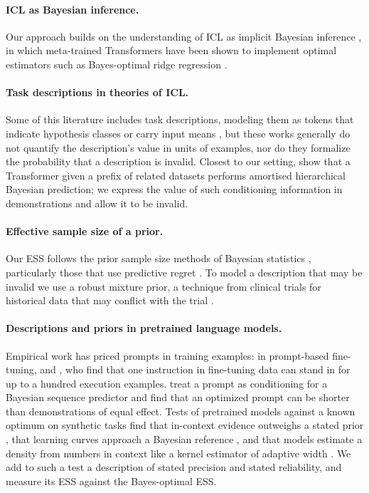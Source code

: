 \documentclass{article}
\begin{document}
\paragraph{ICL as Bayesian inference.} Our approach builds on the understanding of ICL as implicit Bayesian inference \citep{xie2022}, in which meta-trained Transformers have been shown to implement optimal estimators such as Bayes-optimal ridge regression \citep{akyurek2023, raventos2023, panwar2024}.

\paragraph{Task descriptions in theories of ICL.} Some of this literature includes task descriptions, modeling them as tokens that indicate hypothesis classes or carry input means \citep{huangge2025, lin2025, tong2026, lin2024}, but these works generally do not quantify the description's value in units of examples, nor do they formalize the probability that a description is invalid. Closest to our setting, \citet{zhu2026} show that a Transformer given a prefix of related datasets performs amortised hierarchical Bayesian prediction; we express the value of such conditioning information in demonstrations and allow it to be invalid.

\paragraph{Effective sample size of a prior.} Our ESS follows the prior sample size methods of Bayesian statistics \citep{morita2008, reimherr2021, neuenschwander2020}, particularly those that use predictive regret \citep{reznik2026}. To model a description that may be invalid we use a robust mixture prior, a technique from clinical trials for historical data that may conflict with the trial \citep{schmidli2014}.

\paragraph{Descriptions and priors in pretrained language models.} Empirical work has priced prompts in training examples: \citet{lescao2021} in prompt-based fine-tuning, and \citet{cook2026}, who find that one instruction in fine-tuning data can stand in for up to a hundred execution examples. \citet{wenliang2025} treat a prompt as conditioning for a Bayesian sequence predictor and find that an optimized prompt can be shorter than demonstrations of equal effect. Tests of pretrained models against a known optimum on synthetic tasks find that in-context evidence outweighs a stated prior \citep{gupta2025}, that learning curves approach a Bayesian reference \citep{akata2026}, and that models estimate a density from numbers in context like a kernel estimator of adaptive width \citep{liu2025}. We add to such a test a description of stated precision and stated reliability, and measure its ESS against the Bayes-optimal ESS.
\end{document}
